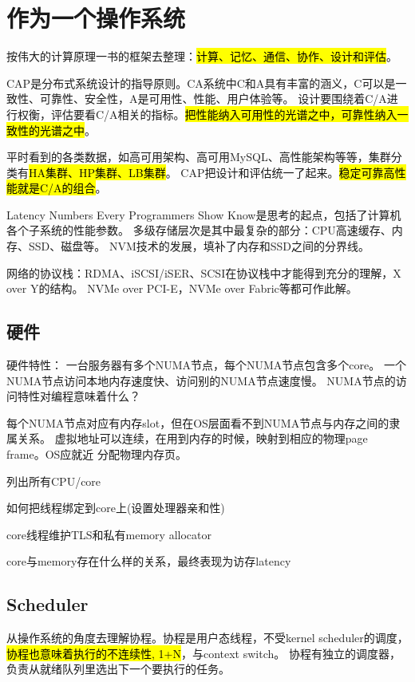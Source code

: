 \chapter{作为一个操作系统}

按伟大的计算原理一书的框架去整理：\hl{计算、记忆、通信、协作、设计和评估}。

CAP是分布式系统设计的指导原则。CA系统中C和A具有丰富的涵义，C可以是一致性、可靠性、安全性，A是可用性、性能、用户体验等。
设计要围绕着C/A进行权衡，评估要看C/A相关的指标。\hl{把性能纳入可用性的光谱之中，可靠性纳入一致性的光谱之中}。

平时看到的各类数据，如高可用架构、高可用MySQL、高性能架构等等，集群分类有\hl{HA集群、HP集群、LB集群}。
CAP把设计和评估统一了起来。\hl{稳定可靠高性能就是C/A的组合}。

Latency Numbers Every Programmers Show Know是思考的起点，包括了计算机各个子系统的性能参数。
多级存储层次是其中最复杂的部分：CPU高速缓存、内存、SSD、磁盘等。
NVM技术的发展，填补了内存和SSD之间的分界线。

网络的协议栈：RDMA、iSCSI/iSER、SCSI在协议栈中才能得到充分的理解，X over Y的结构。
NVMe over PCI-E，NVMe over Fabric等都可作此解。

\section{硬件}

硬件特性： 一台服务器有多个NUMA节点，每个NUMA节点包含多个core。
一个NUMA节点访问本地内存速度快、访问别的NUMA节点速度慢。
NUMA节点的访问特性对编程意味着什么？

每个NUMA节点对应有内存slot，但在OS层面看不到NUMA节点与内存之间的隶属关系。
虚拟地址可以连续，在用到内存的时候，映射到相应的物理page frame。OS应就近
分配物理内存页。

\begin{enumbox}
\item 列出所有CPU/core
\item 如何把线程绑定到core上(设置处理器亲和性)
\item core线程维护TLS和私有memory allocator
\item core与memory存在什么样的关系，最终表现为访存latency
\end{enumbox}

\section{Scheduler}

从操作系统的角度去理解协程。协程是用户态线程，不受kernel scheduler的调度，
\hl{协程也意味着执行的不连续性, 1+N}，与context switch。
协程有独立的调度器，负责从就绪队列里选出下一个要执行的任务。

